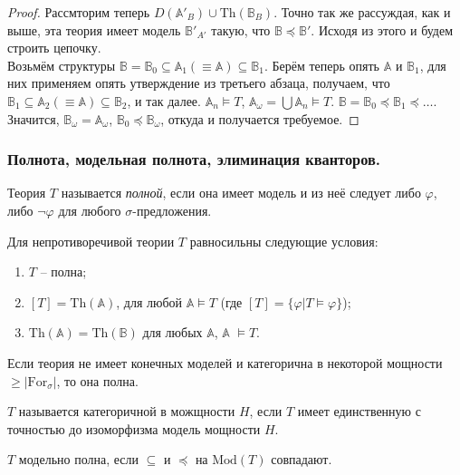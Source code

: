 \begin{proof}
    Рассмторим теперь $D(\mathbb{A}'_B) \cup \text{Th}(\mathbb{B}_B)$. Точно так же рассуждая, как и выше, эта теория имеет модель $\mathbb{B}'_{A'}$ такую, что $\mathbb{B} \preceq \mathbb{B}'$. Исходя из этого и будем строить цепочку. \\ 

    Возьмём структуры $\mathbb{B} = \mathbb{B}_0 \subseteq \mathbb{A}_1 (\equiv \mathbb{A}) \subseteq \mathbb{B}_1$. Берём теперь опять $\mathbb{A}$ и $\mathbb{B}_1$, для них применяем опять утверждение из третьего абзаца, получаем, что $\mathbb{B}_1 \subseteq \mathbb{A}_2 (\equiv \mathbb{A}) \subseteq \mathbb{B}_2$, и так далее. $\mathbb{A}_n \models T$, $\mathbb{A}_\omega = \bigcup \mathbb{A}_n \models T$. $\mathbb{B} = \mathbb{B}_0 \preceq \mathbb{B}_1 \preceq \ldots$. Значится, $\mathbb{B}_\omega = \mathbb{A}_\omega$, $\mathbb{B}_0 \preceq \mathbb{B}_\omega$, откуда и получается требуемое.
\end{proof}

\subsubsection{Полнота, модельная полнота, элиминация кванторов.} 

\begin{definition}
    Теория $T$ называется \textit{полной}, если она имеет модель и из неё следует либо $\varphi$, либо $\neg \varphi$ для любого $\sigma$-предложения.
\end{definition}

\begin{stat}
    Для непротиворечивой теории $T$ равносильны следующие условия: 

    \begin{enumerate}
        \item $T$ -- полна; 
        \item $[T] = \text{Th} (\mathbb{A})$, для любой $\mathbb{A} \models T$ (где $[T] = \{\varphi | T \models \varphi\}$); 
        \item $\text{Th}(\mathbb{A}) = \text{Th}(\mathbb{B})$ для любых $\mathbb{A}$, $\mathbb{A}$ $\models T$.
    \end{enumerate}
\end{stat}

\begin{theorem}
    Если теория не имеет конечных моделей и категорична в некоторой мощности $\geq |\text{For}_\sigma|$, то она полна.
\end{theorem}

\begin{definition}
    $T$ называется категоричной в можщности $H$, если $T$ имеет единственную с точностью до изоморфизма модель мощности $H$.
\end{definition}

\begin{definition}
    $T$ модельно полна, если $\subseteq$ и $\preceq$ на $\text{Mod}(T)$ совпадают.
\end{definition}

